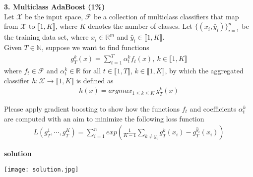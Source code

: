 \documentclass{article}
\begin{document}
\bigskip

\noindent
{\bf \Large 3. Multiclass AdaBoost (1\%)}\\

Let ${\mathcal X}$ be the input space, ${\mathcal F}$ be a collection of multiclass classifiers that map from ${\mathcal X}$ to $\llbracket 1, K \rrbracket$, where $K$ denotes the number of classes. Let $\{(x_i
, {\hat y}_i)\}^{n}_{i = 1}$ be the training data set, where $x_i \in {\mathbb R}^m$ and ${\hat y}_i \in \llbracket 1, K \rrbracket$.\\

Given $T \in {\mathbb N}$, suppose we want to find functions
\begin{align*}
    g_T^k(x) = \sum_{t = 1}^{T} \alpha_t^k f_t(x),\ k \in \llbracket 1, K \rrbracket
\end{align*}
where $f_t \in {\mathcal F}$ and $\alpha_t^k \in {\mathbb R}$ for all $t \in \llbracket 1, T \rrbracket$, $k \in \llbracket 1, K \rrbracket$, by which the
aggregated classifier $h : {\mathcal X} \rightarrow \llbracket 1, K \rrbracket$ is defined as
\begin{align*}
    h(x) = argmax_{1 \le k \le K}\ g^k_T(x)
\end{align*}

Please apply gradient boosting to show how the functions $f_t$ and coefficients $\alpha^k_t$ are computed with an aim to minimize the following loss function
\begin{align*}
    L(g_T^1, \cdots, g_T^K) = \sum_{i = 1}^{n} exp(\frac{1}{K - 1} \sum_{k \ne {\hat y}_i} g_T^k(x_i) - g_T^{{\hat y}_i}(x_i))
\end{align*}

\noindent
{\bf \large solution}\\

\begin{center}
    \texttt{[image: solution.jpg]}\\
\end{center}
\end{document}
